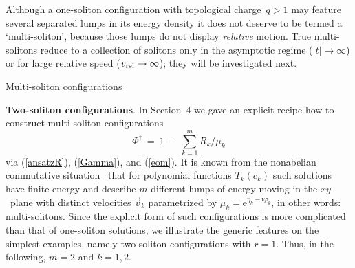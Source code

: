 \documentclass[a4paper,11pt]{article}
\makeatletter
\renewcommand{\section}{\@startsection{section}{1}{0pt}{\medskipamount}
{\medskipamount}{\large\bf}}
\numberwithin{equation}{section}
\def\e{\mbox{e}}
\def\i{\mbox{i}}
\makeatother
\begin{document}
Although a one-soliton configuration with topological charge~$q{>}1$
may feature several separated lumps in its
energy density it does not deserve to be termed a `multi-soliton', because
those lumps do not display {\it relative\/} motion. True multi-solitons reduce
to a collection of solitons only in the asymptotic regime ($|t|\to\infty$)
or for large relative speed ($v_{\rm rel}\to\infty$);
they will be investigated next.


\section{Multi-soliton configurations}

\noindent
{\bf Two-soliton configurations}.
In Section~4 we gave an explicit recipe how to construct multi-soliton
configurations
\begin{equation}
\Phi^\dagger\ =\ 1\ -\ \sum_{k=1}^m R_k/\mu_k
\end{equation}
via (\ref{ansatzR}), (\ref{Gamma}), and (\ref{eom}).
It is known from the nonabelian commutative situation~\cite{ward}
that for polynomial functions $T_k(c_k)$ such solutions have finite energy
and describe $m$ different lumps of energy moving in the $xy$~plane with
distinct velocities $\vec v_k$ parametrized by
$\mu_k{=}\e^{\eta_k-\i\varphi_k}$, in other words: multi-solitons.
Since the explicit form of such configurations is more complicated than
that of one-soliton solutions, we illustrate the generic
features on the simplest examples, namely two-soliton configurations
with $r{=}1$. Thus, in the following, $m=2$ and $k=1,2$.
\end{document}
